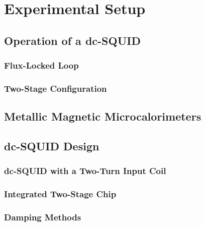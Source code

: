 \chapter{Experimental Setup}

\section{Operation of a dc-SQUID}

\subsection{Flux-Locked Loop}

\subsection{Two-Stage Configuration}

\section{Metallic Magnetic Microcalorimeters} 

\section{dc-SQUID Design}

\subsection{dc-SQUID with a Two-Turn Input Coil}

\subsection{Integrated Two-Stage Chip}

\subsection{Damping Methods}